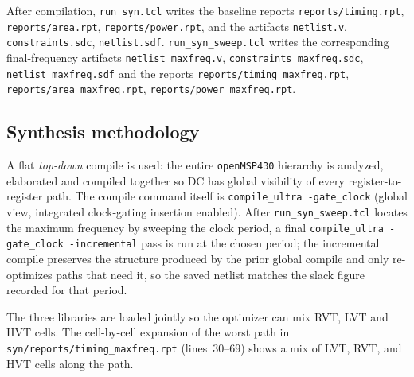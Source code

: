 After compilation, \texttt{run\_syn.tcl} writes the baseline reports
\texttt{reports/timing.rpt}, \texttt{reports/area.rpt},
\texttt{reports/power.rpt}, and the artifacts \texttt{netlist.v},
\texttt{constraints.sdc}, \texttt{netlist.sdf}.
\texttt{run\_syn\_sweep.tcl} writes the corresponding final-frequency
artifacts \texttt{netlist\_maxfreq.v}, \texttt{constraints\_maxfreq.sdc},
\texttt{netlist\_maxfreq.sdf} and the reports
\texttt{reports/timing\_maxfreq.rpt},
\texttt{reports/area\_maxfreq.rpt},
\texttt{reports/power\_maxfreq.rpt}.

\subsection{Synthesis methodology}

A flat \emph{top-down} compile is used: the entire
\texttt{openMSP430} hierarchy is analyzed, elaborated and compiled
together so DC has global visibility of every register-to-register
path. The compile command itself is \texttt{compile\_ultra -gate\_clock}
(global view, integrated clock-gating insertion enabled). After
\texttt{run\_syn\_sweep.tcl} locates the maximum frequency by sweeping
the clock period, a final \texttt{compile\_ultra -gate\_clock
-incremental} pass is run at the chosen period; the incremental compile
preserves the structure produced by the prior global compile and only
re-optimizes paths that need it, so the saved netlist matches the
slack figure recorded for that period.

The three libraries are loaded jointly so the optimizer can mix RVT,
LVT and HVT cells. The cell-by-cell expansion of the worst path in
\texttt{syn/reports/timing\_maxfreq.rpt} (lines~30--69) shows a mix of
LVT, RVT, and HVT cells along the path.

